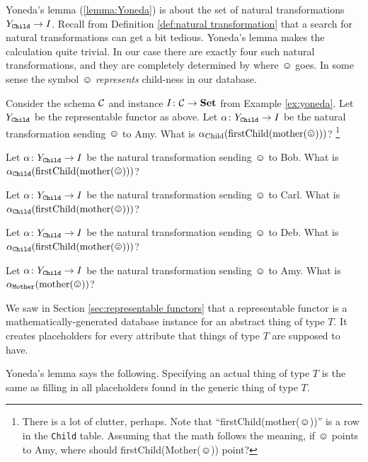 \documentclass[CT4S-EN-RU]{subfiles}
\begin{document}
Yoneda's lemma (\ref{lemma:Yoneda}) is about the set of natural transformations $Y_{\tt Child}\to I$. Recall from Definition \ref{def:natural transformation} that a search for natural transformations can get a bit tedious. Yoneda's lemma makes the calculation quite trivial. In our case there are exactly four such natural transformations, and they are completely determined by where $\smiley$ goes. In some sense the symbol $\smiley$ {\em represents} child-ness in our database. 

\begin{exercise}
Consider the schema $\mcC$ and instance $I\taking\mcC\to\Set$ from Example \ref{ex:yoneda}. Let $Y_{\tt Child}$ be the representable functor as above. 
\sexc Let $\alpha\taking Y_{\tt Child}\to I$ be the natural transformation sending $\smiley$ to Amy. What is $\alpha_{\tn{Child}}(\tn{firstChild(mother}(\smiley)))$?
\footnote{There is a lot of clutter, perhaps. Note that “firstChild(mother($\smiley$))” is a row in the {\tt Child} table. Assuming that the math follows the meaning, if $\smiley$ points to Amy, where should firstChild(Mother($\smiley$)) point?}
\item Let $\alpha\taking Y_{\tt Child}\to I$ be the natural transformation sending $\smiley$ to Bob. What is $\alpha_{\tt Child}(\tn{firstChild(mother}(\smiley)))$?
\item Let $\alpha\taking Y_{\tt Child}\to I$ be the natural transformation sending $\smiley$ to Carl. What is $\alpha_{\tt Child}(\tn{firstChild(mother}(\smiley)))$?
\item Let $\alpha\taking Y_{\tt Child}\to I$ be the natural transformation sending $\smiley$ to Deb. What is $\alpha_{\tt Child}(\tn{firstChild(mother}(\smiley)))$?
\item Let $\alpha\taking Y_{\tt Child}\to I$ be the natural transformation sending $\smiley$ to Amy. What is $\alpha_{\tt Mother}(\tn{mother}(\smiley))$?
\endsexc
\end{exercise}

We saw in Section \ref{sec:representable functors} that a representable functor is a mathematically-generated database instance for an abstract thing of type $T$. It creates placeholders for every attribute that things of type $T$ are supposed to have.

\begin{slogan}
Yoneda's lemma says the following. Specifying an actual thing of type $T$ is the same as filling in all placeholders found in the generic thing of type $T$.
\end{slogan}
\end{document}

